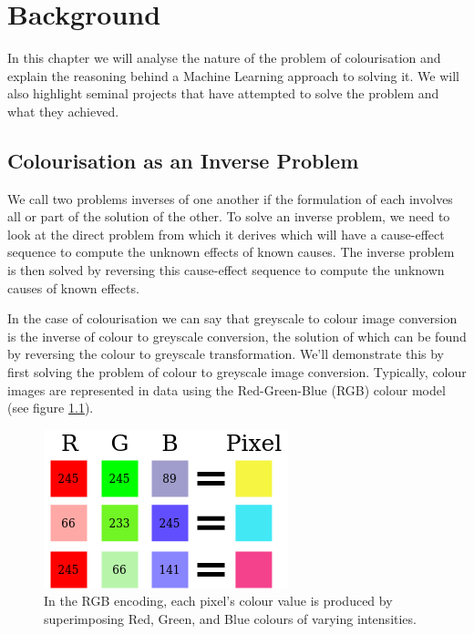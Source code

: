 \documentclass{l4proj}
\begin{document}
\chapter{Background}

In this chapter we will analyse the nature of the problem of colourisation and explain the reasoning behind a Machine Learning approach to solving it. We will also highlight seminal projects that have attempted to solve the problem and what they achieved.

\section{Colourisation as an Inverse Problem}
\label{inverse-prob}
We call two problems inverses of one another if the formulation of each involves all or part of the solution of the other. To solve an inverse problem, we need to look at the direct problem from which it derives which will have a cause-effect sequence to compute the unknown effects of known causes. The inverse problem is then solved by reversing this cause-effect sequence to compute the unknown causes of known effects\cite{Inverses}.

In the case of colourisation we can say that greyscale to colour image conversion is the inverse of colour to greyscale conversion, the solution of which can be found by reversing the colour to greyscale transformation. We'll demonstrate this by first solving the problem of colour to greyscale image conversion. Typically, colour images are represented in data using the Red-Green-Blue (RGB) colour model (see figure \ref{fig:rgb}). 
\begin{figure}[H]
    \centering
    \includegraphics[width=0.5\linewidth]{images/RGB.png}    

    \caption{In the RGB encoding, each pixel's colour value is produced by superimposing Red, Green, and Blue colours of varying intensities.}

    \label{fig:rgb} 
\end{figure}
\end{document}
